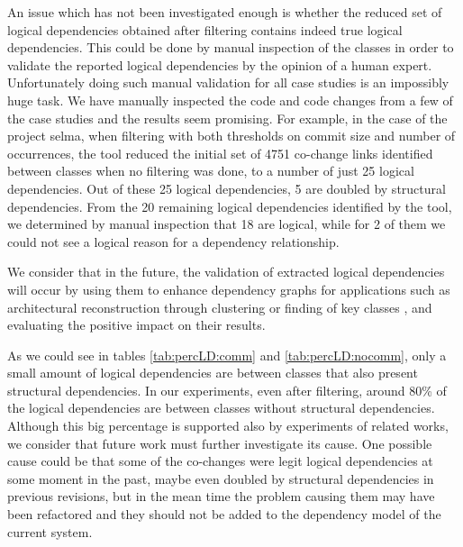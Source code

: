 \documentclass[conference]{IEEEtran}
\begin{document}
An issue which has not been investigated enough is whether the reduced set of logical dependencies obtained after filtering contains indeed true logical dependencies. This could be done by manual inspection of the classes in order to validate the reported logical dependencies by the opinion of a human expert. Unfortunately doing such manual validation for all case studies is an impossibly huge task. We have manually inspected the code and code changes from a few of the case studies and the results seem promising. For example, in the case of the project selma, when filtering with both thresholds on commit size and number of occurrences, the tool reduced the initial set of 4751 co-change links identified between classes when no filtering was done, to a number of just 25 logical dependencies. Out of these 25 logical dependencies, 5 are doubled by structural dependencies. From the 20 remaining logical dependencies identified by the tool, we determined by manual inspection that 18 are logical, while for 2 of them we could not see a logical reason for a dependency relationship. 

We consider that in the future, the validation of extracted logical dependencies will occur by using them to enhance dependency graphs for  applications such as architectural reconstruction through clustering \cite{SoraConti} or finding of key classes \cite{PagerankENASE}, and evaluating the positive impact on their results.   


As we could see in tables \ref{tab:percLD:comm} and \ref{tab:percLD:nocomm}, only a small amount of logical dependencies are between classes that also present structural dependencies.  In our experiments, even after filtering, around 80\% of the logical dependencies are between classes without structural dependencies. Although this big percentage is supported also by experiments of related works, we consider that future work must further investigate its cause. One possible cause could be that some of the co-changes were legit logical dependencies at some moment in the past, maybe even doubled by structural dependencies in previous revisions, but in the mean time the problem causing them may have been refactored and they should not be added to the dependency model of the current system.  
\end{document}
